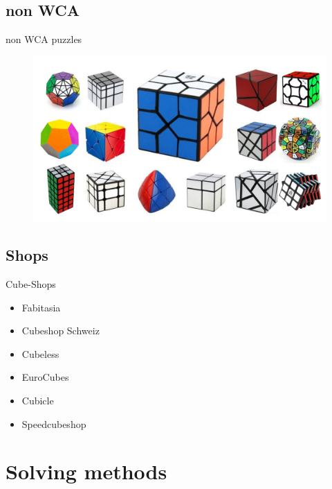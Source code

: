 \documentclass{beamer}
\begin{document}
        \subsection{non WCA}
            \begin{frame}{non WCA puzzles}
                \begin{figure}
                    \includegraphics[width=\textwidth]{assets/nonWCAall.jpg}
                \end{figure}
            \end{frame}
        \subsection{Shops}
            \begin{frame}{Cube-Shops}
                \begin{itemize}
                    \item Fabitasia
                    \item Cubeshop Schweiz
                    \item Cubeless
                    \item EuroCubes
                    \item Cubicle
                    \item Speedcubeshop
                \end{itemize}
            \end{frame}
        
    \section{Solving methods}
\end{document}
